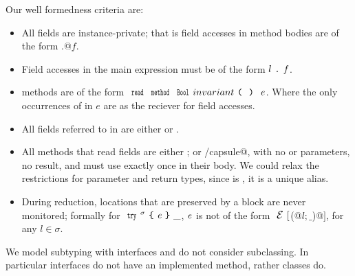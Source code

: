  Our well formedness criteria are:
\begin{itemize}
\item All fields are instance-private; that is field accesses in method bodies are of the form
\Q@this.@$f$.

\item Field accesses in the main expression
must be of the form $l{ \mbox{ {\texttt{.}} } }\mathit{f}$.

\item \validate{} methods are of the form $\Kw{read} \Kw{method} \Kw{Bool} invariant\oR\cR\ \e$.
Where the only occurrences of \Q@this@ in $e$ are as the reciever for field accesses.
\item All fields referred to in \validate{} are either \Q@imm@ or \Q@capsule@.
\item All methods that read \Q@capsule@ fields
are either \Q@read@;
or \Q@mut/capsule@, with no \Q@mut@ or \Q@read@ parameters, no \Q@mut@ result, and 
must use \Q@this@ exactly once in their body. We could relax the restrictions for parameter and return types, since \Q@this@ is \Q@capsule@, it is a unique alias.
\item 
During reduction, locations that are preserved by a \Q@try@ block are
never monitored; formally 
for $\Kw{try}^\sigma\oC\e\cC\_$, ${\mathit{e}}$ is not of the form $\ctx[$\Q@M(@$l;\_$\Q@)@$]$, for any $l\in\sigma$.
\end{itemize}

\noindent We model subtyping with interfaces 
and do not consider subclassing.
In particular interfaces do not have an implemented \validate{} method, rather classes do.

